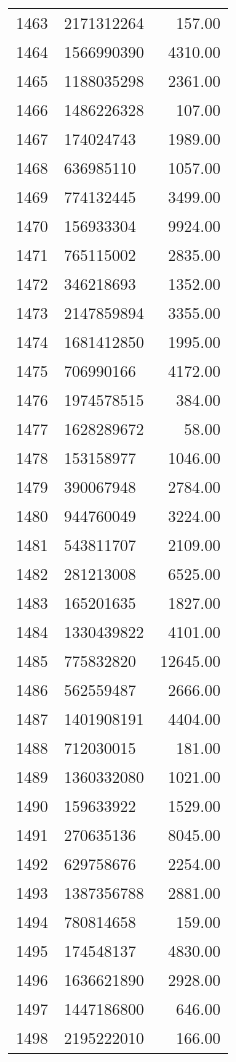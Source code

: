 \begin{table}[ht]
\begin{tabular}{rlr}
  1463 & 2171312264 & 157.00 \\ 
  1464 & 1566990390 & 4310.00 \\ 
  1465 & 1188035298 & 2361.00 \\ 
  1466 & 1486226328 & 107.00 \\ 
  1467 & 174024743 & 1989.00 \\ 
  1468 & 636985110 & 1057.00 \\ 
  1469 & 774132445 & 3499.00 \\ 
  1470 & 156933304 & 9924.00 \\ 
  1471 & 765115002 & 2835.00 \\ 
  1472 & 346218693 & 1352.00 \\ 
  1473 & 2147859894 & 3355.00 \\ 
  1474 & 1681412850 & 1995.00 \\ 
  1475 & 706990166 & 4172.00 \\ 
  1476 & 1974578515 & 384.00 \\ 
  1477 & 1628289672 & 58.00 \\ 
  1478 & 153158977 & 1046.00 \\ 
  1479 & 390067948 & 2784.00 \\ 
  1480 & 944760049 & 3224.00 \\ 
  1481 & 543811707 & 2109.00 \\ 
  1482 & 281213008 & 6525.00 \\ 
  1483 & 165201635 & 1827.00 \\ 
  1484 & 1330439822 & 4101.00 \\ 
  1485 & 775832820 & 12645.00 \\ 
  1486 & 562559487 & 2666.00 \\ 
  1487 & 1401908191 & 4404.00 \\ 
  1488 & 712030015 & 181.00 \\ 
  1489 & 1360332080 & 1021.00 \\ 
  1490 & 159633922 & 1529.00 \\ 
  1491 & 270635136 & 8045.00 \\ 
  1492 & 629758676 & 2254.00 \\ 
  1493 & 1387356788 & 2881.00 \\ 
  1494 & 780814658 & 159.00 \\ 
  1495 & 174548137 & 4830.00 \\ 
  1496 & 1636621890 & 2928.00 \\ 
  1497 & 1447186800 & 646.00 \\ 
  1498 & 2195222010 & 166.00 \\ 

\end{tabular}
\end{table}
